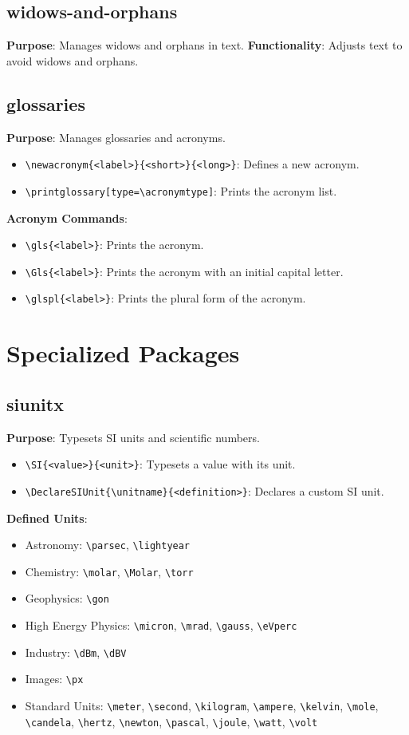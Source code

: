 \documentclass[12pt,twoside]{report}
\begin{document}
\subsection{widows-and-orphans}
\textbf{Purpose}: Manages widows and orphans in text.
\textbf{Functionality}: Adjusts text to avoid widows and orphans.

\subsection{glossaries}
\textbf{Purpose}: Manages glossaries and acronyms.
\begin{itemize}
    \item \verb|\newacronym{<label>}{<short>}{<long>}|: Defines a new acronym.
    \item \verb|\printglossary[type=\acronymtype]|: Prints the acronym list.
\end{itemize}
\textbf{Acronym Commands}:
\begin{itemize}
    \item \verb|\gls{<label>}|: Prints the acronym.
    \item \verb|\Gls{<label>}|: Prints the acronym with an initial capital letter.
    \item \verb|\glspl{<label>}|: Prints the plural form of the acronym.
\end{itemize}

\section{Specialized Packages}

\subsection{siunitx}
\textbf{Purpose}: Typesets SI units and scientific numbers.
\begin{itemize}
    \item \verb|\SI{<value>}{<unit>}|: Typesets a value with its unit.
    \item \verb|\DeclareSIUnit{\unitname}{<definition>}|: Declares a custom SI unit.
\end{itemize}

\textbf{Defined Units}:
\begin{itemize}
    \item Astronomy: \verb|\parsec|, \verb|\lightyear|
    \item Chemistry: \verb|\molar|, \verb|\Molar|, \verb|\torr|
    \item Geophysics: \verb|\gon|
    \item High Energy Physics: \verb|\micron|, \verb|\mrad|, \verb|\gauss|, \verb|\eVperc|
    \item Industry: \verb|\dBm|, \verb|\dBV|
    \item Images: \verb|\px|
    \item Standard Units: \verb|\meter|, \verb|\second|, \verb|\kilogram|, \verb|\ampere|, \verb|\kelvin|, \verb|\mole|, \verb|\candela|, \verb|\hertz|, \verb|\newton|, \verb|\pascal|, \verb|\joule|, \verb|\watt|, \verb|\volt|
\end{itemize}
\end{document}
